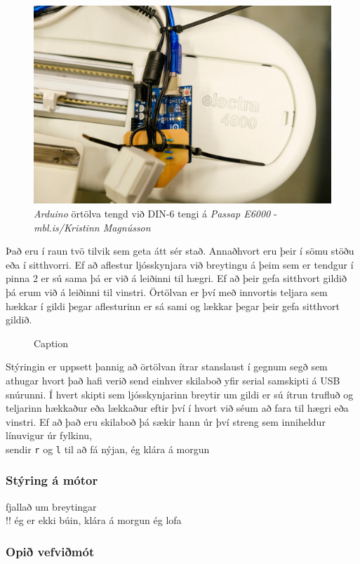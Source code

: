 \begin{figure}[H]
    \centering
    \includegraphics[width=0.5\linewidth]{myndir/elli/electra4600.jpg}
    \caption{\textit{Arduino} örtölva tengd við DIN-6 tengi á \textit{Passap E6000} - \textit{mbl.is/Kristinn Magnússon}}
    \label{fig:arduino}
\end{figure}
Það eru í raun tvö tilvik sem geta átt sér stað. Annaðhvort eru þeir í sömu stöðu eða í sitthvorri. Ef að aflestur ljósskynjara við breytingu á þeim sem er tendgur í pinna 2 er sú sama þá er við á leiðinni til hægri. Ef að þeir gefa sitthvort gildið þá erum við á leiðinni til vinstri. Örtölvan er því með innvortis teljara sem hækkar í gildi þegar aflesturinn er sá sami og lækkar þegar þeir gefa sitthvort gildið.
\begin{figure}[H]
    \centering
    \caption{Caption}
    \label{fig:enter-label}
\end{figure}

Stýringin er uppsett þannig að örtölvan ítrar stanslaust í gegnum segð sem athugar hvort það hafi verið send einhver skilaboð yfir serial samskipti á USB snúrunni. Í hvert skipti sem ljósskynjarinn breytir um gildi er sú ítrun trufluð og teljarinn hækkaður eða lækkaður eftir því í hvort við séum að fara til hægri eða vinstri. Ef að það eru skilaboð þá sækir hann úr því streng sem inniheldur línuvigur úr fylkinu,\\
sendir \texttt{r} og \texttt{l} til að fá nýjan, ég klára á morgun
\subsubsection{Stýring á mótor}
fjallað um breytingar\\ 
!! ég er ekki búin, klára á morgun ég lofa
\subsubsection{Opið vefviðmót}
